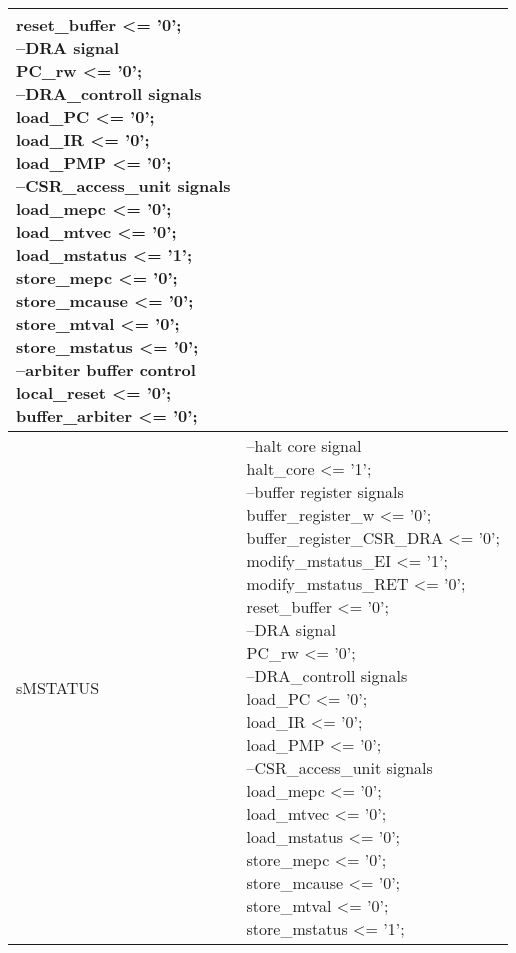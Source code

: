 \begin{longtable}{| p{} | p{} |}
{		reset\_buffer <= '0';\\
		--DRA signal\\
		PC\_rw <= '0';\\
		--DRA\_controll signals\\
		load\_PC <= '0';\\
		load\_IR <= '0';\\
		load\_PMP <= '0';\\
		--CSR\_access\_unit signals\\
		load\_mepc <= '0';\\
		load\_mtvec <= '0';\\
		load\_mstatus <= '1';\\
		store\_mepc <= '0';\\
		store\_mcause <= '0';\\
		store\_mtval <= '0';\\
		store\_mstatus <= '0';\\
		--arbiter buffer control\\
		local\_reset <= '0';\\
		buffer\_arbiter <= '0';} \\
	\hline
	sMSTATUS & \makecell{--halt core signal\\
		halt\_core <= '1';\\
		--buffer register signals\\
		buffer\_register\_w <= '0';\\
		buffer\_register\_CSR\_DRA <= '0';\\
		modify\_mstatus\_EI <= '1';\\
		modify\_mstatus\_RET <= '0';\\
		reset\_buffer <= '0';\\
		--DRA signal\\
		PC\_rw <= '0';\\
		--DRA\_controll signals\\
		load\_PC <= '0';\\
		load\_IR <= '0';\\
		load\_PMP <= '0';\\
		--CSR\_access\_unit signals\\
		load\_mepc <= '0';\\
		load\_mtvec <= '0';\\
		load\_mstatus <= '0';\\
		store\_mepc <= '0';\\
		store\_mcause <= '0';\\
		store\_mtval <= '0';\\
		store\_mstatus <= '1';\\
}
\end{longtable}
